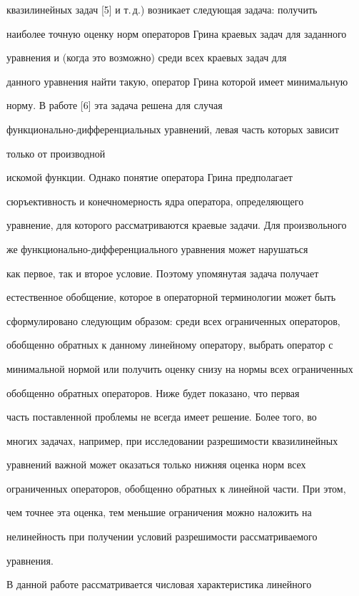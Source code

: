 квазилинейных задач [5] и т.\,д.) возникает следующая задача: получить 


наиболее точную оценку норм операторов Грина краевых задач для заданного 


уравнения и (когда это возможно) среди всех краевых задач для  


данного уравнения найти такую, оператор Грина которой имеет минимальную 


норму. В работе [6] эта задача решена для случая 


функционально-дифференциальных уравнений, левая часть которых зависит 


только от производной 


искомой функции. Однако понятие оператора Грина предполагает 


сюръективность и конечномерность ядра оператора, определяющего  


уравнение, для которого рассматриваются краевые задачи. Для произвольного 


же функционально-дифференциального уравнения может нарушаться  


как первое, так и второе условие. Поэтому упомянутая задача получает 


естественное обобщение, которое в операторной терминологии может быть 


сформулировано следующим образом: среди всех ограниченных операторов, 


обобщенно обратных к данному линейному оператору, выбрать оператор с 


минимальной нормой или получить оценку снизу на нормы всех ограниченных 


обобщенно обратных операторов. Ниже будет показано, что первая  


часть поставленной проблемы не всегда имеет решение. Более того, во  


многих задачах, например, при исследовании разрешимости квазилинейных 


уравнений важной может оказаться только нижняя оценка норм всех 


ограниченных операторов, обобщенно обратных к линейной части. При этом, 


чем точнее эта оценка, тем меньшие ограничения можно наложить на 


нелинейность при получении условий разрешимости рассматриваемого 


уравнения. 


В данной работе рассматривается числовая характеристика линейного  


